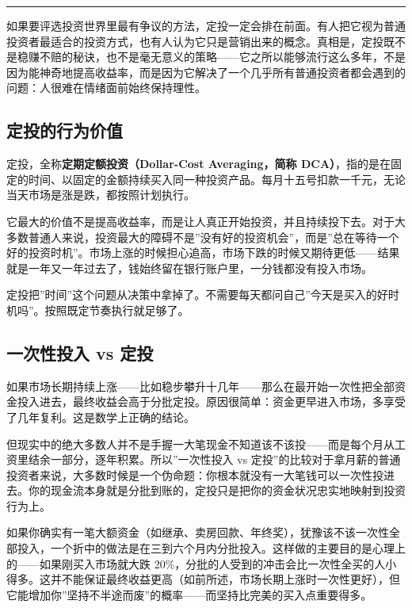 \documentclass[a4paper,11pt,oneside,fontset=none,UTF8,zihao=-4]{ctexbook}
\begin{document}
\begin{center}{\color{dh-bronze}\rule{0.2\textwidth}{0.5pt}}\end{center}

如果要评选投资世界里最有争议的方法，定投一定会排在前面。有人把它视为普通投资者最适合的投资方式，也有人认为它只是营销出来的概念。真相是，定投既不是稳赚不赔的秘诀，也不是毫无意义的策略------它之所以能够流行这么多年，不是因为能神奇地提高收益率，而是因为它解决了一个几乎所有普通投资者都会遇到的问题：人很难在情绪面前始终保持理性。

\subsection{定投的行为价值}\label{ux5b9aux6295ux7684ux884cux4e3aux4ef7ux503c}

定投，全称\textbf{定期定额投资（Dollar-Cost Averaging，简称
DCA）}，指的是在固定的时间、以固定的金额持续买入同一种投资产品。每月十五号扣款一千元，无论当天市场是涨是跌，都按照计划执行。

它最大的价值不是提高收益率，而是让人真正开始投资，并且持续投下去。对于大多数普通人来说，投资最大的障碍不是''没有好的投资机会''，而是''总在等待一个好的投资时机''。市场上涨的时候担心追高，市场下跌的时候又期待更低------结果就是一年又一年过去了，钱始终留在银行账户里，一分钱都没有投入市场。

定投把''时间''这个问题从决策中拿掉了。不需要每天都问自己''今天是买入的好时机吗''。按照既定节奏执行就足够了。

\subsection{一次性投入 vs
定投}\label{ux4e00ux6b21ux6027ux6295ux5165-vs-ux5b9aux6295}

如果市场长期持续上涨------比如稳步攀升十几年------那么在最开始一次性把全部资金投入进去，最终收益会高于分批定投。原因很简单：资金更早进入市场，多享受了几年复利。这是数学上正确的结论。

但现实中的绝大多数人并不是手握一大笔现金不知道该不该投------而是每个月从工资里结余一部分，逐年积累。所以''一次性投入
vs
定投''的比较对于拿月薪的普通投资者来说，大多数时候是一个伪命题：你根本就没有一大笔钱可以一次性投进去。你的现金流本身就是分批到账的，定投只是把你的资金状况忠实地映射到投资行为上。

如果你确实有一笔大额资金（如继承、卖房回款、年终奖），犹豫该不该一次性全部投入，一个折中的做法是在三到六个月内分批投入。这样做的主要目的是心理上的------如果刚买入市场就大跌
20\%，分批的人受到的冲击会比一次性全买的人小得多。这并不能保证最终收益更高（如前所述，市场长期上涨时一次性更好），但它能增加你''坚持不半途而废''的概率------而坚持比完美的买入点重要得多。
\end{document}
